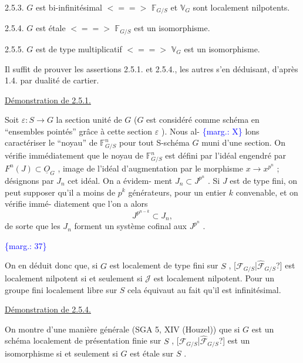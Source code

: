\documentclass[11pt]{article}
\newcommand{\scanpage}[1]{\par\bigskip\noindent{\small\sffamily[scan #1]}\par}
\newcommand{\mspage}[1]{{\small\sffamily[p.\,#1]}}
\newcommand{\hand}[1]{\textcolor{blue}{#1}}
\newcommand{\margin}[1]{\textcolor{blue}{\{\textsf{marg.:} #1\}}}
\newcommand{\uline}[1]{\underline{#1}}
\newcommand{\unsure}[1]{[#1?]}
\begin{document}
2.5.3. \quad $G$ est bi-infinitésimal $<==>$ $\mathbb{F}_{G/S}$ et $\mathbb{V}_G$ sont localement
nilpotents.

2.5.4. \quad $G$ est étale $<==>$ $\mathbb{F}_{G/S}$ est un isomorphisme.

2.5.5. \quad $G$ est de type multiplicatif $<==>$ $\mathbb{V}_G$ est un isomorphisme.

Il suffit de prouver les assertions 2.5.1. et 2.5.4., les
autres s'en déduisant, d'après 1.4. par dualité de cartier.

\uline{Démonstration de 2.5.1.}

Soit $\varepsilon : S \to G$ la section unité de $G$ ($G$ est considéré
comme schéma en ``ensembles pointés'' grâce à cette section $\varepsilon$ ). Nous al-%
\margin{X} lons caractériser le ``noyau'' de $\mathbb{F}^n_{G/S}$ pour tout S-schéma $G$ muni d'une
section. On vérifie immédiatement que le noyau de $\mathbb{F}^n_{G/S}$ est défini par
l'idéal engendré par $F^n(J) \subset \underline{O}_G$ , image de l'idéal d'augmentation
par le morphisme $x \to x^{p^n}$ ; désignons par $J_n$ cet idéal. On a évidem-%
ment $J_n \subset J^{p^n}$ . Si $J$ est de type fini, on peut supposer qu'il a moins
de $p^k$ générateurs, pour un entier $k$ convenable, et on vérifie immé-%
diatement que l'on a alors
\[ J^{p^{n-k}} \subset J_n , \]
de sorte que les $J_n$ forment un système cofinal aux $J^{p^n}$ .

\margin{37}

\clearpage
\scanpage{129/38}
\mspage{\hand{II.10}}

On en déduit donc que, si $G$ est localement de type fini sur
$S$ , \unsure{$\mathcal{F}_{G/S}$|$\hat{\mathcal{F}}_{G/S}$} est localement nilpotent si et seulement si $\mathcal{J}$ est localement
nilpotent. Pour un groupe fini localement libre sur $S$ cela équivaut au
fait qu'il est infinitésimal.

\uline{Démonstration de 2.5.4.}

On montre d'une manière générale (SGA 5, XIV (Houzel)) que si
$G$ est un schéma localement de présentation finie sur $S$ , \unsure{$\mathcal{F}_{G/S}$|$\hat{\mathcal{F}}_{G/S}$} est un
isomorphisme si et seulement si $G$ est étale sur $S$ .
\end{document}
